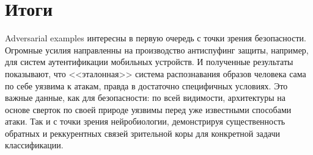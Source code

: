 \documentclass[a4paper,12pt]{article}
\begin{document}
\section{Итоги}

Adversarial examples интересны в первую очередь с точки зрения безопасности. Огромные усилия направленны на производство антиспуфинг защиты, например, для систем аутентификации мобильных устройств. И полученные результаты показывают, что <<эталонная>> система распознавания образов человека сама по себе уязвима к атакам, правда в достаточно специфичных условиях. Это важные данные, как для безопасности: по всей видимости, архитектуры на основе сверток по своей природе уязвимы перед уже известными способами атаки. Так и с точки зрения нейробиологии, демонстрируя существенность обратных и реккурентных связей зрительной коры для конкретной задачи классификации.

\printbibliography[heading=bibintoc]
\end{document}
